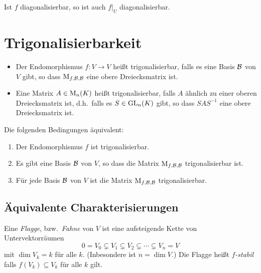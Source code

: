 \begin{corollary}
  Ist $f$ diagonalisierbar, so ist auch $f|_U$ diagonalisierbar.
\end{corollary}





\section{Trigonalisierbarkeit}



\begin{definition}
  \leavevmode
  \begin{itemize}
    \item
      Der Endomorphismus $f \colon V \to V$ heißt trigonalisierbar, falls es eine Basis $\mathcal{B}$ von $V$ gibt, so dass $\operatorname{M}_{f, \mathcal{B}, \mathcal{B}}$ eine obere Dreiecksmatrix ist.
    \item
      Eine Matrix $A \in \operatorname{M}_{n}(K)$ heißt trigonalisierbar, falls $A$ ähnlich zu einer oberen Dreiecksmatrix ist, d.h.\ falls es $S \in \operatorname{GL}_{n}(K)$ gibt, so dass $S A S^{-1}$ eine obere Dreiecksmatrix ist.
  \end{itemize}
\end{definition}

\begin{lemma}
  Die folgenden Bedingungen äquivalent:
  \begin{enumerate}
    \item
      Der Endomorphismus $f$ ist trigonalisierbar.
    \item
      Es gibt eine Basis $\mathcal{B}$ von $V$, so dass die Matrix $\operatorname{M}_{f, \mathcal{B}, \mathcal{B}}$ trigonalisierbar ist.
    \item
      Für jede Basis $\mathcal{B}$ von $V$ ist die Matrix $\operatorname{M}_{f, \mathcal{B}, \mathcal{B}}$ trigonalisierbar.
  \end{enumerate}
\end{lemma}



\subsection*{Äquivalente Charakterisierungen}

\begin{definition}
  Eine \emph{Flagge}, bzw.\ \emph{Fahne} von $V$ ist eine aufsteigende Kette von Untervektorräumen
  \[
                0
    =           V_0
    \subsetneq  V_1
    \subsetneq  V_2
    \subsetneq  \dotsb
    \subsetneq  V_n
    =           V
  \]
  mit $\dim V_k = k$ für alle $k$.
  \textup(Inbesondere ist $n = \dim V$.\textup)
  Die Flagge heißt \emph{$f$-stabil} falls $f(V_k) \subseteq V_k$ für alle $k$ gilt.
\end{definition}

